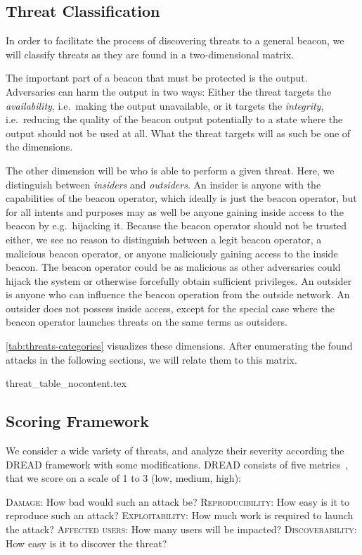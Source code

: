 \subsection{Threat Classification}
In order to facilitate the process of discovering threats to a general beacon, we will classify threats as they are found in a two-dimensional matrix.

The important part of a beacon that must be protected is the output. Adversaries can harm the output in two ways: Either the threat targets the \emph{availability}, i.e.\ making the output unavailable, or it targets the \emph{integrity}, i.e.\ reducing the quality of the beacon output potentially to a state where the output should not be used at all. What the threat targets will as such be one of the dimensions.

The other dimension will be who is able to perform a given threat.
Here, we distinguish between \emph{insiders} and \emph{outsiders}.
An insider is anyone with the capabilities of the beacon operator, which ideally is just the beacon operator, but for all intents and purposes may as well be anyone gaining inside access to the beacon by e.g.\ hijacking it.
Because the beacon operator should not be trusted either, we see no reason to distinguish between a legit beacon operator, a malicious beacon operator, or anyone maliciously gaining access to the inside beacon.
The beacon operator could be as malicious as other adversaries could hijack the system or otherwise forcefully obtain sufficient privileges.
An outsider is anyone who can influence the beacon operation from the outside network.
An outsider does not possess inside access, except for the special case where the beacon operator launches threats on the same terms as outsiders.

\cref{tab:threats-categories} visualizes these dimensions. After enumerating the found attacks in the following sections, we will relate them to this matrix.

{threat_table_nocontent.tex}

\subsection{Scoring Framework}
We consider a wide variety of threats, and analyze their severity according the DREAD framework with some modifications. DREAD consists of five metrics~\cite{dread}, that we score on a scale of 1 to 3 (low, medium, high):

\textsc{Damage}: How bad would such an attack be?
\textsc{Reproducibility}: How easy is it to reproduce such an attack?
\textsc{Exploitability}: How much work is required to launch the attack?
\textsc{Affected users}: How many users will be impacted?
\textsc{Discoverability}: How easy is it to discover the threat?


